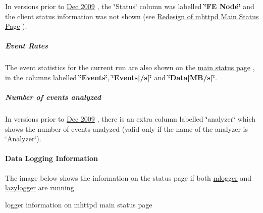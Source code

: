 In versions prior to \hyperlink{NDF_ndf_dec_2009}{Dec 2009} , the \char`\"{}Status\char`\"{} column was labelled {\bfseries \char`\"{}FE Node\char`\"{}} and the client status information was not shown (see \hyperlink{RC_mhttpd_status_page_redesign}{Redesign of mhttpd Main Status Page} ).

\par


\par
 \label{RC_mhttpd_status_page_features_idx_mhttpd_page_status_event-rate}
\hypertarget{RC_mhttpd_status_page_features_idx_mhttpd_page_status_event-rate}{}
 \hypertarget{RC_mhttpd_status_page_features_RC_mhttpd_status_Event_Rates}{}\subparagraph{Event Rates}\label{RC_mhttpd_status_page_features_RC_mhttpd_status_Event_Rates}
The event statistics for the current run are also shown on the \hyperlink{RC_mhttpd_status_page_features_RC_mhttpd_status_Equipment_info}{main status page} , in the columns labelled {\bfseries \char`\"{}Events\char`\"{}}, {\bfseries \char`\"{}Events\mbox{[}/s\mbox{]}\char`\"{}} and {\bfseries \char`\"{}Data\mbox{[}MB/s\mbox{]}\char`\"{}}.

\par


\par
 \hypertarget{RC_mhttpd_status_page_features_RC_mhttpd_status_analyzer}{}\subparagraph{Number of events analyzed}\label{RC_mhttpd_status_page_features_RC_mhttpd_status_analyzer}
In versions prior to \hyperlink{NDF_ndf_dec_2009}{Dec 2009} , there is an extra column labelled \char`\"{}analyzer\char`\"{} which shows the number of events analyzed (valid only if the name of the analyzer is \char`\"{}Analyzer\char`\"{}).

\par


\par
\hypertarget{RC_mhttpd_status_page_features_RC_mhttpd_status_Logger}{}\paragraph{Data Logging Information}\label{RC_mhttpd_status_page_features_RC_mhttpd_status_Logger}
The image below shows the information on the status page if both \hyperlink{F_Logging_F_mlogger_utility}{mlogger} and \hyperlink{F_LogUtil_F_lazylogger_utility}{lazylogger} are running.

\begin{center} logger information on mhttpd main status page \par
\par
\par
  \end{center}  \par


